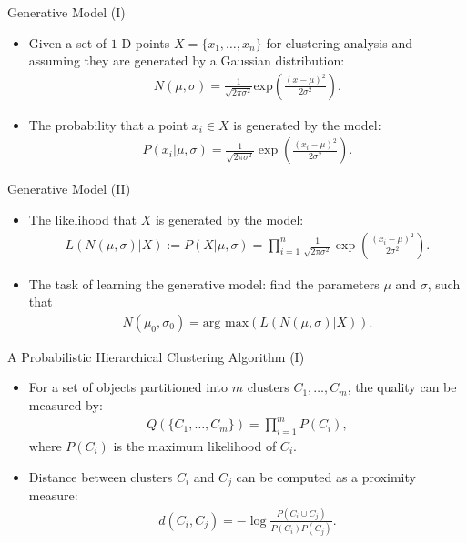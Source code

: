 \begin{frame}{Generative Model (I)}
  \centering
  \begin{itemize}
  \item Given a set of $1$-D points $X = \{x_1, \ldots, x_n\}$ for
    clustering analysis and assuming they are generated by a Gaussian
    distribution:
    \begin{align}
      N(\mu,\sigma) = \frac{1}{\sqrt{2 \pi \sigma^2}}
      \text{exp}\left({\frac{(x-\mu)^2}{2\sigma^2}}\right).
    \end{align}
  \item The probability that a point $x_i \in X$ is generated by the
    model:
    \begin{align}
      P(x_i \vert \mu, \sigma) = \frac{1}{\sqrt{2\pi\sigma^2}} \exp\left(
      \frac{(x_i-\mu)^2}{2\sigma^2}\right).
    \end{align}
  \end{itemize}
\end{frame}

\begin{frame}{Generative Model (II)}
  \centering
  \begin{itemize}
  \item The likelihood that $X$ is generated by the model:
    \begin{align}
      L(N(\mu,\sigma) \vert X) := P(X \vert \mu, \sigma) =
      \prod_{i=1}^{n} \frac{1}{\sqrt{2\pi\sigma^2}} \exp\left(
      \frac{(x_i-\mu)^2}{2\sigma^2}\right).
    \end{align}
  \item The task of learning the generative model: find the parameters
    $\mu$ and $\sigma$, such that
    \begin{align}
      N(\mu_0,\sigma_0) = \text{arg max}\left( L(N(\mu,\sigma)\vert X)
      \right).
    \end{align}
  \end{itemize}
\end{frame}

\begin{frame}{A Probabilistic Hierarchical Clustering Algorithm (I)}
  \centering
  \begin{itemize}
  \item For a set of objects partitioned into $m$ clusters $C_1, \ldots,
    C_m$,
    the quality can be measured by:
    \begin{align}
      Q(\{C_1, \ldots, C_m\}) = \prod_{i=1}^{m} P(C_i),
    \end{align}
    where $P(C_i)$ is the maximum likelihood of $C_i$.
  \item Distance between clusters $C_i$ and $C_j$ can be computed as a
    proximity measure:
    \begin{align}
      d(C_i,C_j) = - \log \frac{P(C_i \cup C_j)}{P(C_i)P(C_j)}.
    \end{align}
  \end{itemize}
\end{frame}

